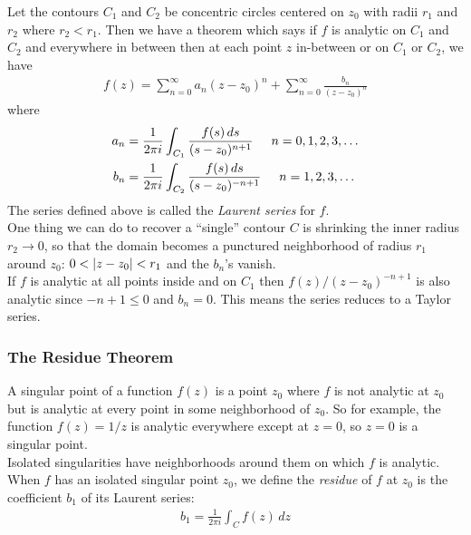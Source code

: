 \documentclass{book}
\theoremstyle{definition}
\newcommand{\f}[2]{\frac{#1}{#2}}
\begin{document}
Let the contours $C_1$ and $C_2$ be concentric circles centered on $z_0$ with radii $r_1$ and $r_2$ where $r_2 < r_1$. Then we have a theorem which says if $f$ is analytic on $C_1$ and $C_2$ and everywhere in between then at each point $z$ in-between or on $C_1$ or $C_2$, we have
\begin{align}
\boxed{f(z) = \sum^\infty_{n=0}a_n (z - z_0)^n + \sum^\infty_{n=0}\f{b_n}{(z- z_0)^n}}
\end{align}
where
\begin{align}
a_n &= \f{1}{2\pi i }\int_{C_1} \f{f(s)\,ds}{(s - z_0)^{n+1}}\hspace{0.5cm} n = 0,1,2,3,\dots \\ 
b_n &= \f{1}{2\pi i }\int_{C_2} \f{f(s)\,ds}{(s - z_0)^{-n+1}}\hspace{0.5cm} n = 1,2,3,\dots
\end{align}
The series defined above is called the \textit{Laurent series} for $f$. \\

One thing we can do to recover a ``single'' contour $C$ is shrinking the inner radius $r_2 \to 0$, so that the domain becomes a punctured neighborhood of radius $r_1$ around $z_0$: $0 < \abs{z - z_0} < r_1$ and the $b_n$'s vanish.\\

If $f$ is analytic at all points inside and on $C_1$ then $f(z) / (z - z_0)^{-n+1}$ is also analytic since $-n+1 \leq 0$ and $b_n = 0$. This means the series reduces to a Taylor series. 











\subsubsection{The Residue Theorem}

A singular point of a function $f(z)$ is a point $z_0$ where $f$ is not analytic at $z_0$ but is analytic at every point in some neighborhood of $z_0$. So for example, the function $f(z) = 1/z$ is analytic everywhere except at $z=0$, so $z=0$ is a singular point. \\

Isolated singularities have neighborhoods around them on which $f$ is analytic. \\

When $f$ has an isolated singular point $z_0$, we define the \textit{residue} of $f$ at $z_0$ is the coefficient $b_1$ of its Laurent series:
\begin{align}
\boxed{b_1 = \f{1}{2\pi i}\int_{C} f(z)\,dz}
\end{align}
\end{document}
